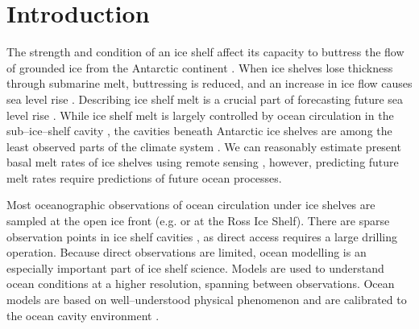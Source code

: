 
\section{Introduction}


The strength and condition of an ice shelf affect its capacity to buttress the flow of grounded ice from the Antarctic continent \citep{gagliardini2010coupling}. When ice shelves lose thickness through submarine melt, buttressing is reduced, and an increase in ice flow causes sea level rise \citep{pritchard2012antarctic}.
Describing ice shelf melt is a crucial part of forecasting future sea level rise \citep{liu2015ocean,scambos2017much}.  While ice shelf melt is largely controlled by ocean circulation in the sub--ice--shelf cavity \citep{rignot2013ice}, the cavities beneath Antarctic ice shelves are among the least observed parts of the climate system \citep{stevens2020ocean}. We can reasonably estimate present basal melt rates of ice shelves using remote sensing \citep[e.g][]{rignot2013ice,mankoff2012role,goldberg2019accurately}, however, predicting future melt rates require predictions of future ocean processes. 

Most oceanographic observations of ocean circulation under ice shelves are sampled at the open ice front 
(e.g. \cite{arzeno2014ocean} or \cite{smethie2005circulation} at the Ross Ice Shelf). There are sparse observation points in ice shelf cavities \citep[e.g.][]{begeman2018ocean,stevens2020ocean,foster1983temperature}, as direct access requires a large drilling operation. 
Because direct observations are limited, ocean modelling is an especially important part of ice shelf science. Models are used to understand ocean conditions at a higher resolution, spanning between observations.  Ocean models are based on well--understood physical phenomenon  and are calibrated to the ocean cavity environment \citep[e.g.][]{millgate2013effect, holland2003modelling}. 



